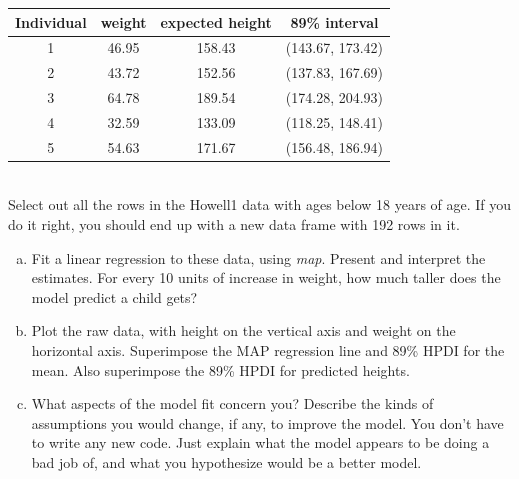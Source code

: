 \documentclass[12pt]{article}\usepackage[]{graphicx}\usepackage[]{color}
\newenvironment{problem}[2][Problem]{\begin{trivlist}
\item[\hskip \labelsep {\bfseries #1}\hskip \labelsep {\bfseries #2.}]}{\end{trivlist}}
\begin{document}
\begin{center}
 \begin{tabular}{||c c c c||} 
 \hline
 Individual & weight & expected height & 89\% interval \\ [0.5ex] 
 \hline\hline
 1 & 46.95 & 158.43 & (143.67, 173.42) \\ 
 \hline
 2 & 43.72 & 152.56 & (137.83, 167.69) \\
 \hline
 3 & 64.78 & 189.54 & (174.28, 204.93) \\
 \hline
 4 & 32.59 & 133.09 & (118.25, 148.41) \\
 \hline
 5 & 54.63 & 171.67 & (156.48, 186.94) \\ [1ex] 
 \hline
\end{tabular}
\end{center}

\begin{problem}{4H2}
\text{}\\
Select out all the rows in the Howell1 data with ages below 18 years of age. If you do it right, you should end up with a new data frame with 192 rows in it.
\begin{enumerate}[(a)]
\item Fit a linear regression to these data, using \textit{map}. Present and interpret the estimates. For every 10 units of increase in weight, how much taller does the model predict a child gets?
\item Plot the raw data, with height on the vertical axis and weight on the horizontal axis. Superimpose the MAP regression line and 89\% HPDI for the mean. Also superimpose the 89\% HPDI for predicted heights.
\item What aspects of the model fit concern you? Describe the kinds of assumptions you would change, if any, to improve the model. You don't have to write any new code. Just explain what the model appears to be doing a bad job of, and what you hypothesize would be a better model.
\end{enumerate}
\end{problem}
\\
\end{document}

